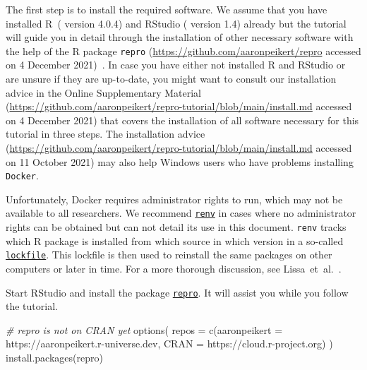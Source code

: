 \documentclass[psych,tutorial,accept,moreauthors,pdftex]{Definitions/mdpi}
\newenvironment{Shaded}{\begin{snugshade}}{\end{snugshade}}
\newcommand{\AttributeTok}[1]{\textcolor[rgb]{0.77,0.63,0.00}{#1}}
\newcommand{\CommentTok}[1]{\textcolor[rgb]{0.56,0.35,0.01}{\textit{#1}}}
\newcommand{\FunctionTok}[1]{\textcolor[rgb]{0.00,0.00,0.00}{#1}}
\newcommand{\NormalTok}[1]{#1}
\newcommand{\StringTok}[1]{\textcolor[rgb]{0.31,0.60,0.02}{#1}}
\begin{document}
The first step is to install the required software. We assume that you
have installed R~(\citep{R-base} version 4.0.4) and RStudio
(\citep{rstudio} version 1.4) already but the tutorial will guide you in
detail through the installation of other necessary software with the
help of the R package {\texttt{repro}} 
(\url{https://github.com/aaronpeikert/repro} accessed on 4 December 2021)~\citep{R-repro}. In case you have either not installed R and RStudio or
are unsure if they are up-to-date, you might want to consult our
installation advice in the Online Supplementary Material
(\url{https://github.com/aaronpeikert/repro-tutorial/blob/main/install.md} accessed on 4 December 2021) that covers the installation of all software
necessary for this tutorial in three steps. The
{installation advice}
(\url{https://github.com/aaronpeikert/repro-tutorial/blob/main/install.md} accessed on 11 October 2021) may also help Windows users who have problems installing
\texttt{Docker}.

Unfortunately, Docker requires administrator rights to run, which may
not be available to all researchers. We recommend
\href{https://rstudio.github.io/renv/articles/renv.html}{\texttt{renv}}
\citep{R-renv} in cases where no administrator rights can be obtained
but can not detail its use in this document. \texttt{renv} tracks which
R package is installed from which source in which version in a so-called
\href{https://rstudio.github.io/renv/articles/lockfile.html}{\texttt{lockfile}}.
This lockfile is then used to reinstall the same packages on other
computers or later in time. For a more thorough discussion, see
Lissa~et~al.~\citep{vanlissa2020worcs}.

Start RStudio and install the package
\href{https://github.com/aaronpeikert}{\texttt{repro}}\citep{R-repro}.
It will assist you while you follow the tutorial.

\begin{adjustwidth}{0.5cm}{0cm} 
\begin{Shaded}
\begin{Highlighting}[]
\CommentTok{\# repro is not on CRAN yet}
\FunctionTok{options}\NormalTok{(}
  \AttributeTok{repos =} \FunctionTok{c}\NormalTok{(}\AttributeTok{aaronpeikert =} \StringTok{\textquotesingle{}https://aaronpeikert.r{-}universe.dev\textquotesingle{}}\NormalTok{,}
            \AttributeTok{CRAN =} \StringTok{\textquotesingle{}https://cloud.r{-}project.org\textquotesingle{}}\NormalTok{)}
\NormalTok{)}
\FunctionTok{install.packages}\NormalTok{(}\StringTok{\textquotesingle{}repro\textquotesingle{}}\NormalTok{)}
\end{Highlighting}
\end{Shaded}
\end{adjustwidth}
\end{document}
